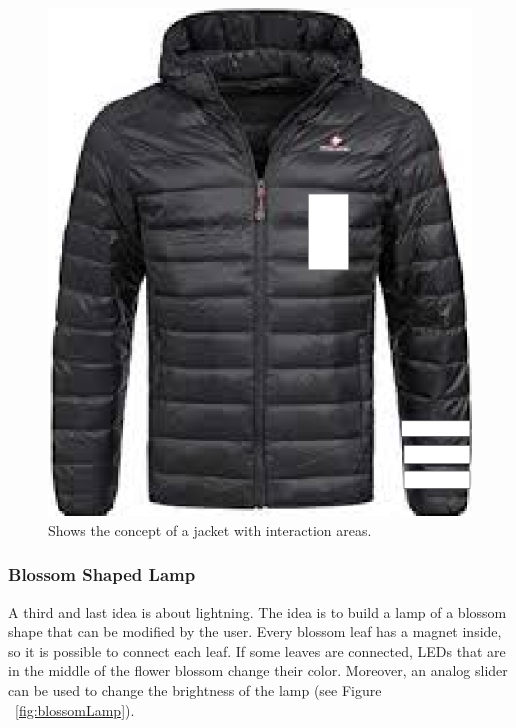 \documentclass[04_projectProcess.tex]{subfiles}
\begin{document}
    \begin{figure}[h!]
        \centering
        \includegraphics[scale=0.2]{images/projectideas/jacket.png}
        \caption{Shows the concept of a jacket with interaction areas.}
        \label{fig:jacketIdea}
    \end{figure}

    \subsubsection{Blossom Shaped Lamp}
    \label{BlossomShapedLamp}
    \begin{flushleft}
        A third and last idea is about lightning. The idea is to build a lamp of a blossom shape that 
        can be modified by the user. Every blossom leaf has a magnet inside, so it is possible to connect 
        each leaf. If some leaves are connected, LEDs that are in the middle of the flower blossom 
        change their color. Moreover, an analog slider can be used to change the brightness of the lamp 
        (see Figure ~\ref{fig:blossomLamp}).
    \end{flushleft}
\end{document}
